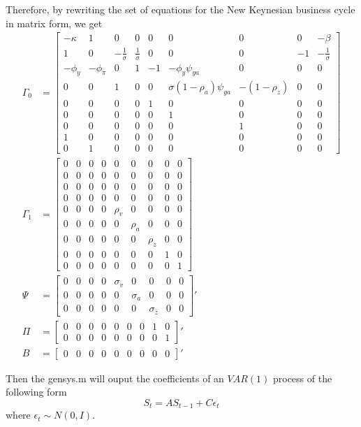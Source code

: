 \documentclass[12pt]{article}
\theoremstyle{definition}
\newcommand{\bra}[1]{\left[#1\right]}
\newcommand{\mat}[1]{\begin{matrix}#1\end{matrix}}
\newcommand{\bmat}[1]{\bra{\mat{#1}}}
\begin{document}
Therefore, by rewriting the set of equations for the New Keynesian business cycle in matrix form, we get
\begin{align*}
\Gamma_0 &= \bmat{-\kappa & 1 & 0 &0 &0 &0 &0 &0 &-\beta\\
1& 0& -\frac{1}{\sigma}&  \frac{1}{\sigma} & 0 &0 &0 &-1& -\frac{1}{\sigma}\\
-\phi_y & -\phi_{\pi} & 0& 1& -1& -\phi_y\psi_{ya} &0& 0& 0\\
0 &0 &1 &0& 0& \sigma(1-\rho_a)\psi_{ya}& -(1-\rho_z) &0 &0\\
0 &0 &0 &0 &1 &0& 0& 0 &0\\
0 &0 &0 &0 &0 &1 &0 &0 &0\\
0 &0 &0 &0 &0 &0 &1 &0 &0\\
1 &0 &0 &0 &0 &0 &0 &0 &0\\
0 &1 &0 &0 &0 &0 &0 &0& 0}\\
\Gamma_1 &= \bmat{0 &0 &0& 0& 0& 0& 0& 0& 0\\
0 &0& 0& 0& 0& 0 &0& 0 &0\\
0 &0& 0& 0& 0 &0 &0 &0& 0\\
0 &0& 0& 0& 0 &0 &0 &0 &0\\
0 &0& 0& 0& \rho_v &0& 0& 0& 0\\
0 &0& 0& 0& 0 &\rho_a& 0& 0 &0\\
0 &0& 0& 0& 0& 0 &\rho_z& 0 &0\\
0 &0& 0& 0& 0& 0& 0 &1 &0\\
0 &0& 0& 0& 0 &0 &0& 0& 1}\\
\Psi    &= \bmat{0 &0& 0 &0 &\sigma_v &0& 0& 0& 0\\
0 &0& 0& 0& 0& \sigma_a &0& 0& 0\\
0 &0& 0& 0& 0& 0& \sigma_z& 0& 0}'\\
\Pi     &= \bmat{0& 0 &0 &0& 0& 0& 0& 1& 0\\
0& 0& 0& 0& 0& 0& 0& 0& 1}'\\
B   &= \bmat{0& 0& 0& 0& 0& 0& 0& 0& 0}'
\end{align*}

Then the gensys.m will ouput the coefficients of an $VAR(1)$ process of the following form
\[
S_t = A S_{t-1} + C \epsilon_t
\]
where $\epsilon_t\sim N(0,I)$.
\end{document}
